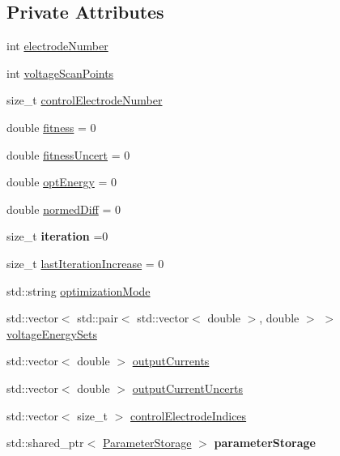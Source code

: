 \subsection*{Private Attributes}
\begin{DoxyCompactItemize}
\item 
int \hyperlink{classOptimizer_a291e98d2c2f585d0076df4eeb04878e5}{electrode\+Number}
\item 
int \hyperlink{classOptimizer_a884c041fbb25a872c72b5062823180b1}{voltage\+Scan\+Points}
\item 
size\+\_\+t \hyperlink{classOptimizer_afa7c063bddb3580a06a62642a3fe2e86}{control\+Electrode\+Number}
\item 
double \hyperlink{classOptimizer_a81991596f83ec6ded5c3b45545cde3cd}{fitness} = 0
\item 
double \hyperlink{classOptimizer_a43a00ff6308575ffdea61f31b5c8bda0}{fitness\+Uncert} = 0
\item 
double \hyperlink{classOptimizer_aea24c0bcb76dfd328f6f21b18046891d}{opt\+Energy} = 0
\item 
double \hyperlink{classOptimizer_a30bba218ee4f03978b1b3358a8b3ea62}{normed\+Diff} = 0
\item 
\mbox{\label{classOptimizer_a65468e1da4d3ffa58a9e1613b41702df}} 
size\+\_\+t {\bfseries iteration} =0
\item 
size\+\_\+t \hyperlink{classOptimizer_a7b388654b13c174e265e81e949d5a69b}{last\+Iteration\+Increase} = 0
\item 
std\+::string \hyperlink{classOptimizer_aba4673e21bc48603b1acd38cfb01b422}{optimization\+Mode}
\item 
std\+::vector$<$ std\+::pair$<$ std\+::vector$<$ double $>$, double $>$ $>$ \hyperlink{classOptimizer_ac4668dd4b83b15cb877daa134f55e5e2}{voltage\+Energy\+Sets}
\item 
std\+::vector$<$ double $>$ \hyperlink{classOptimizer_af36d52fa81a2f38b5cb419e2c800fad6}{output\+Currents}
\item 
std\+::vector$<$ double $>$ \hyperlink{classOptimizer_a65b7546e16edb4ea05a041812590a873}{output\+Current\+Uncerts}
\item 
std\+::vector$<$ size\+\_\+t $>$ \hyperlink{classOptimizer_a0204c3a84115d2ca60ac03b1e08f6db2}{control\+Electrode\+Indices}
\item 
\mbox{\label{classOptimizer_adc47879768ab5fb34797f3f7f9628ae1}} 
std\+::shared\+\_\+ptr$<$ \hyperlink{classParameterStorage}{Parameter\+Storage} $>$ {\bfseries parameter\+Storage}

\end{DoxyCompactItemize}
